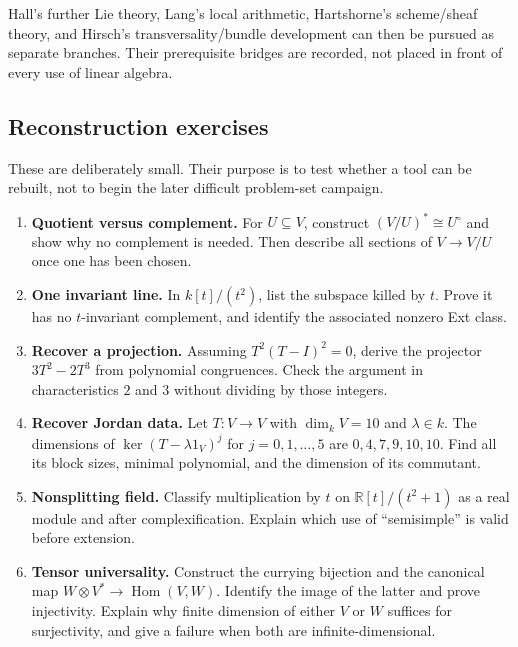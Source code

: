 \documentclass[
  11pt,
]{article}
\providecommand{\tightlist}{%
  \setlength{\itemsep}{0pt}\setlength{\parskip}{0pt}}
\begin{document}
Hall's further Lie theory, Lang's local arithmetic, Hartshorne's
scheme/sheaf theory, and Hirsch's transversality/bundle development can
then be pursued as separate branches. Their prerequisite bridges are
recorded, not placed in front of every use of linear algebra.

\subsection*{Reconstruction exercises}\label{reconstruction-exercises}

These are deliberately small. Their purpose is to test whether a tool
can be rebuilt, not to begin the later difficult problem-set campaign.

\begin{enumerate}
\def\labelenumi{\arabic{enumi}.}
\tightlist
\item
  \textbf{Quotient versus complement.} For \(U\subseteq V\), construct
  \((V/U)^*\cong U^\circ\) and show why no complement is needed. Then
  describe all sections of \(V\to V/U\) once one has been chosen.
\item
  \textbf{One invariant line.} In \(k[t]/(t^2)\), list the subspace
  killed by \(t\). Prove it has no \(t\)-invariant complement, and
  identify the associated nonzero Ext class.
\item
  \textbf{Recover a projection.} Assuming \(T^2(T-I)^2=0\), derive the
  projector \(3T^2-2T^3\) from polynomial congruences. Check the
  argument in characteristics \(2\) and \(3\) without dividing by those
  integers.
\item
  \textbf{Recover Jordan data.} Let \(T:V\to V\) with \(\dim_kV=10\) and
  \(\lambda\in k\). The dimensions of \(\ker(T-\lambda1_V)^j\) for
  \(j=0,1,\ldots,5\) are \(0,4,7,9,10,10\). Find all its block sizes,
  minimal polynomial, and the dimension of its commutant.
\item
  \textbf{Nonsplitting field.} Classify multiplication by \(t\) on
  \(\mathbb R[t]/(t^2+1)\) as a real module and after complexification.
  Explain which use of ``semisimple'' is valid before extension.
\item
  \textbf{Tensor universality.} Construct the currying bijection and the
  canonical map \(W\otimes V^*\to\operatorname{Hom}(V,W)\). Identify the
  image of the latter and prove injectivity. Explain why finite
  dimension of either \(V\) or \(W\) suffices for surjectivity, and give
  a failure when both are infinite-dimensional.

\end{enumerate}
\end{document}
